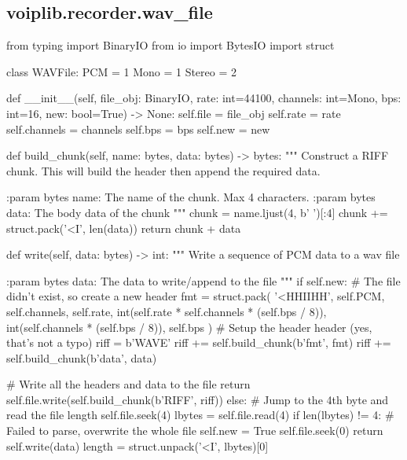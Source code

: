 \subsection{voiplib.recorder.wav\_file}
\begin{pythoncode}
from typing import BinaryIO
from io import BytesIO
import struct


class WAVFile:
    PCM = 1
    Mono = 1
    Stereo = 2

    def __init__(self, file_obj: BinaryIO, rate: int=44100, channels: int=Mono,
                 bps: int=16, new: bool=True) -> None:
        self.file = file_obj
        self.rate = rate
        self.channels = channels
        self.bps = bps
        self.new = new
    
    def build_chunk(self, name: bytes, data: bytes) -> bytes:
        """
        Construct a RIFF chunk. This will build the header then append the
        required data.

        :param bytes name: The name of the chunk. Max 4 characters.
        :param bytes data: The body data of the chunk
        """
        chunk = name.ljust(4, b' ')[:4]
        chunk += struct.pack('<I', len(data))
        return chunk + data
    
    def write(self, data: bytes) -> int:
        """
        Write a sequence of PCM data to a wav file

        :param bytes data: The data to write/append to the file    
        """
        if self.new:
            # The file didn't exist, so create a new header
            fmt = struct.pack(
                '<HHIIHH', self.PCM, self.channels,
                self.rate, int(self.rate * self.channels * (self.bps / 8)),
                int(self.channels * (self.bps / 8)), self.bps
            )
            # Setup the header header (yes, that's not a typo)
            riff = b'WAVE'
            riff += self.build_chunk(b'fmt', fmt)
            riff += self.build_chunk(b'data', data)

            # Write all the headers and data to the file
            return self.file.write(self.build_chunk(b'RIFF', riff))
        else:
            # Jump to the 4th byte and read the file length
            self.file.seek(4)
            lbytes = self.file.read(4)
            if len(lbytes) != 4:
                # Failed to parse, overwrite the whole file
                self.new = True
                self.file.seek(0)
                return self.write(data)
            length = struct.unpack('<I', lbytes)[0]


\end{pythoncode}
